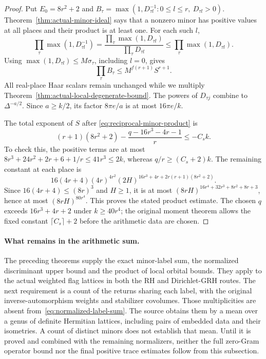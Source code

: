 \begin{proof}
Put $E_0=8r^2+2$ and
$B_\tau=\max(1,D_{\tau l}^{-1}:0\le l\le r,\ D_{\tau l}>0)$.
Theorem~\ref{thm:actual-minor-ideal} says that a nonzero minor
has positive values at all places and their product is at least
one.  For each such $l$,
\[
 \prod_\tau\max(1,D_{\tau l}^{-1})
 =\frac{\prod_\tau\max(1,D_{\tau l})}{\prod_\tau D_{\tau l}}
 \le\prod_\tau\max(1,D_{\tau l}).
\]
Using $\max(1,D_{\tau l})\le M\sigma_\tau$, including
$l=0$, gives
\begin{equation}\label{eq:reciprocal-minor-product}
 \prod_\tau B_\tau\le M^{f(r+1)}S^{r+1}.
\end{equation}
All real-place Haar scalars remain unchanged while we multiply
Theorem~\ref{thm:actual-local-degenerate-bound}.
The powers of $D_{\tau j}$ combine to $\Delta^{-a/2}$.
Since $a\ge k/2$, its factor $8\pi e/a$ is at most
$16\pi e/k$.

The total exponent of $S$ after
\eqref{eq:reciprocal-minor-product} is
\[
 (r+1)(8r^2+2)-\frac{q-16r^3-4r-1}{r}
 \le-C_sk.
\]
To check this, the positive terms are at most
$8r^3+24r^2+2r+6+1/r\le41r^3\le2k$,
whereas $q/r\ge(C_s+2)k$.
The remaining constant at each place is
\[
 16(4r+4)(4r)^{4r^2}
 (2H)^{16r^3+4r+2r(r+1)(8r^2+2)}.
\]
Since $16(4r+4)\le(8r)^3$ and $H\ge1$, it is at most
$(8rH)^{16r^4+32r^3+8r^2+8r+3}$, hence at most
$(8rH)^{80r^4}$.  This proves the stated product estimate.
The chosen $q$ exceeds $16r^3+4r+2$ under $k\ge40r^4$;
the original moment theorem allows the fixed constant
$\lceil C_s\rceil+2$ before the arithmetic data are chosen.
\end{proof}

\paragraph{What remains in the arithmetic sum.}
The preceding theorems supply the exact minor-label sum, the
normalized discriminant upper bound and the product of local
orbital bounds.  They apply to the actual weighted flag lattices
in both the RH and Dirichlet-GRH routes.  The next requirement is
a count of the returns sharing each label, with the original
inverse-automorphism weights and stabilizer covolumes.
Those multiplicities are absent from~\eqref{eq:normalized-label-sum}.
The source obtains them by a mean over a genus of definite
Hermitian lattices, including pairs of embedded data and their
isometries.  A count of distinct minors does not establish that
mean.  Until it is proved and combined with the remaining
normalizers, neither the full zero-Gram operator bound nor the
final positive trace estimates follow from this subsection.
